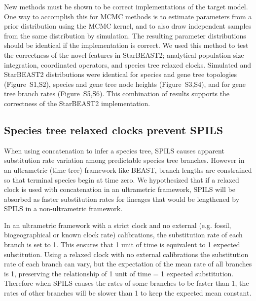 \documentclass[12pt]{article}
\begin{document}
New methods must be shown to be correct implementations of the target model.
One way to accomplish this for MCMC methods is to estimate parameters from a
prior distribution using the MCMC kernel, and to also draw independent samples
from the same distribution by simulation. The resulting parameter
distributions should be identical if the implementation is correct. We used
this method to test the correctness of the novel features in StarBEAST2;
analytical population size integration, coordinated operators, and species
tree relaxed clocks. Simulated and StarBEAST2 distributions were identical for
species and gene tree topologies (Figure~S1,S2), species and gene tree node
heights (Figure~S3,S4), and for gene tree branch rates (Figure~S5,S6). This
combination of results supports the correctness of the StarBEAST2
implementation.

\subsection{Species tree relaxed clocks prevent SPILS}

When using concatenation to infer a species tree, SPILS causes apparent
substitution rate variation among predictable species tree branches. However
in an ultrametric (time tree) framework like BEAST, branch lengths are
constrained so that terminal species begin at time zero. We hypothesized that
if a relaxed clock is used with concatenation in an ultrametric framework,
SPILS will be absorbed as faster substitution rates for lineages that would be
lengthened by SPILS in a non-ultrametric framework.

In an ultrametric framework with a strict clock and no external (e.g. fossil,
biogeographical or known clock rate) calibrations, the substitution rate of
each branch is set to 1. This ensures that 1 unit of time is equivalent to 1
expected substitution. Using a relaxed clock with no external calibrations the
substitution rate of each branch can vary, but the expectation of the mean
rate of all branches is 1, preserving the relationship of 1 unit of time = 1
expected substitution. Therefore when SPILS causes the rates of some branches
to be faster than 1, the rates of other branches will be slower than 1 to keep
the expected mean constant.
\end{document}
